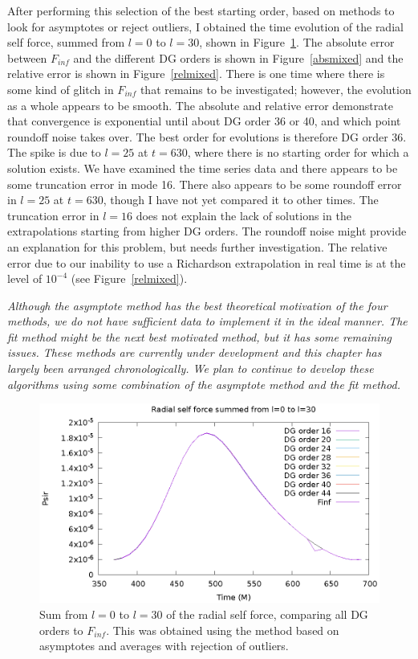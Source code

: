 After performing this selection of the best starting order, based on methods to look for asymptotes or reject outliers, I obtained the time evolution of the radial self force, summed from $l=0$ to $l=30$, shown in Figure~\ref{summixed}. The absolute error between $F_{inf}$ and the different DG orders is shown in Figure~\ref{absmixed} and the relative error is shown in Figure~\ref{relmixed}. There is one time where there is some kind of glitch in $F_{inf}$ that remains to be investigated; however, the evolution as a whole appears to be smooth. The absolute and relative error demonstrate that convergence is exponential until about DG order 36 or 40, and which point roundoff noise takes over. The best order for evolutions is therefore DG order 36. The spike is due to $l=25$ at $t=630$, where there is no starting order for which a solution exists. We have examined the time series data and there appears to be some truncation error in mode 16. There also appears to be some roundoff error in $l=25$ at $t=630$, though I have not yet compared it to other times. The truncation error in $l=16$ does not explain the lack of solutions in the extrapolations starting from higher DG orders. The roundoff noise might provide an explanation for this problem, but needs further investigation. The relative error due to our inability to use a Richardson extrapolation in real time is at the level of $10^{-4}$ (see Figure~\ref{relmixed}).

{\em Although the asymptote method has the best theoretical motivation of the four methods, we do not have sufficient data to implement it in the ideal manner. The fit method might be the next best motivated method, but it has some remaining issues. These methods are currently under development and this chapter has largely been arranged chronologically. We plan to continue to develop these algorithms using some combination of the asymptote method and the fit method.}

\begin{figure}
\includegraphics{psirvtwfinfdgorders}
\caption{Sum from $l=0$ to $l=30$ of the radial self force, comparing all DG orders to $F_{inf}$. This was obtained using the method based on asymptotes and averages with rejection of outliers.}
\label{summixed}
\end{figure}

